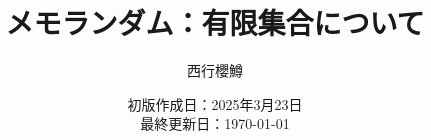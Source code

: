\newcommand{\CATEGORY}{メモランダム}%
\newcommand{\TITLE}{有限集合について}
\newcommand{\AUTHORNAME}{西行櫻鱒}
\newcommand{\CREATEDAT}{2025年3月23日}

\title{\CATEGORY：\TITLE}
\author{\AUTHORNAME}
\date{初版作成日：\CREATEDAT\\最終更新日：\today\\}

